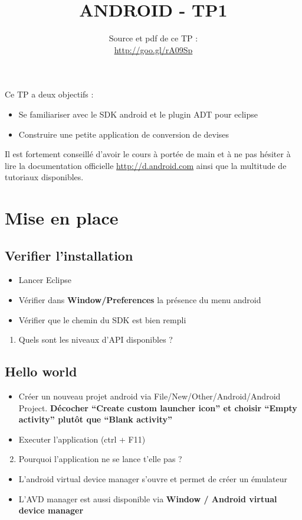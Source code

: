 \documentclass{article}
\title{ANDROID - TP1}
\date{Source et pdf de ce TP :\\\href{http://goo.gl/rA09Sp}{http://goo.gl/rA09Sp}}
\begin{document}
\maketitle
Ce TP a deux objectifs :
\begin{itemize}
\item Se familiariser avec le SDK android et le plugin ADT pour eclipse
\item Construire une petite application de conversion de devises
\end{itemize}
Il est fortement conseillé d'avoir le cours à portée de main et à ne pas hésiter à lire la documentation officielle
\href{http://d.android.com}{http://d.android.com} ainsi que la multitude de tutoriaux disponibles.
\section{Mise en place}
\subsection{Verifier l'installation}
\begin{itemize}
\item Lancer Eclipse
\item Vérifier dans \textbf{Window/Preferences} la présence du menu android
\item Vérifier que le chemin du SDK est bien rempli
\end{itemize}
\begin{enumerate}
\item Quels sont les niveaux d'API disponibles ?
\end{enumerate}
\subsection{Hello world}
\begin{itemize}
\item Créer un nouveau projet android via File/New/Other/Android/Android
Project. \textbf{Décocher ``Create custom launcher icon'' et choisir ``Empty
activity'' plutôt que ``Blank activity''}
\item Executer l'application (ctrl + F11)
\end{itemize}
\begin{enumerate}
 \setcounter{enumi}{1}
\item Pourquoi l'application ne se lance t'elle pas ?
\end{enumerate}
\begin{itemize}
\item L'android virtual device manager s'ouvre et permet de créer un
émulateur
\item L'AVD manager est aussi disponible via \textbf{Window / Android virtual
device manager}
\end{itemize}
\end{document}
